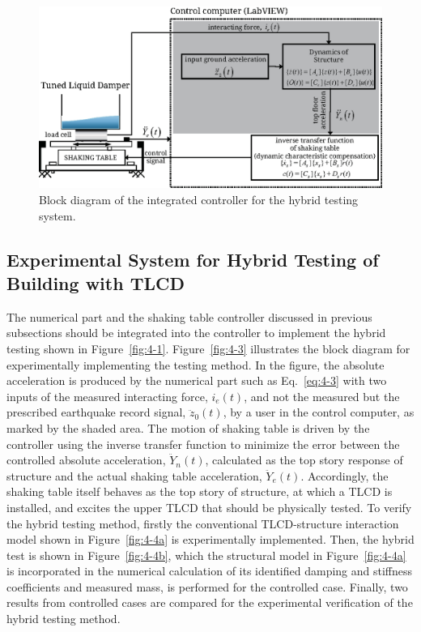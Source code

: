 \begin{figure}[ht]
\centering
\includegraphics[scale =1] {figure/3-3.eps}
\caption{Block diagram of the integrated controller for the hybrid testing system.}
\label{fig:3-3}
\end{figure}









\subsection{Experimental System for Hybrid Testing of Building with TLCD}
The numerical part and the shaking table controller discussed in previous subsections should be integrated into the controller to implement the hybrid testing shown in Figure~\ref{fig:4-1}. Figure~\ref{fig:4-3} illustrates the block diagram for experimentally implementing the testing method. In the figure, the absolute acceleration is produced by the numerical part such as Eq.~\eqref{eq:4-3} with two inputs of the measured interacting force, $i_{e}(t)$, and not the measured but the prescribed earthquake record signal, $\ddot{z}_{0}(t)$, by a user in the control computer, as marked by the shaded area. The motion of shaking table is driven by the controller using the inverse transfer function to minimize the error between the controlled absolute acceleration, $\ddot{Y}_{n}(t)$, calculated as the top story response of structure and the actual shaking table acceleration, $\ddot{Y}_{e}(t)$. Accordingly, the shaking table itself behaves as the top story of structure, at which a TLCD is installed, and excites the upper TLCD that should be physically tested.
To verify the hybrid testing method, firstly the conventional TLCD-structure interaction model shown in Figure~\ref{fig:4-4a} is experimentally implemented. Then, the hybrid test is shown in Figure~\ref{fig:4-4b}, which the structural model in Figure~\ref{fig:4-4a} is incorporated in the numerical calculation of its identified damping and stiffness coefficients and measured mass, is performed for the controlled case. Finally, two results from controlled cases are compared for the experimental verification of the hybrid testing method.


